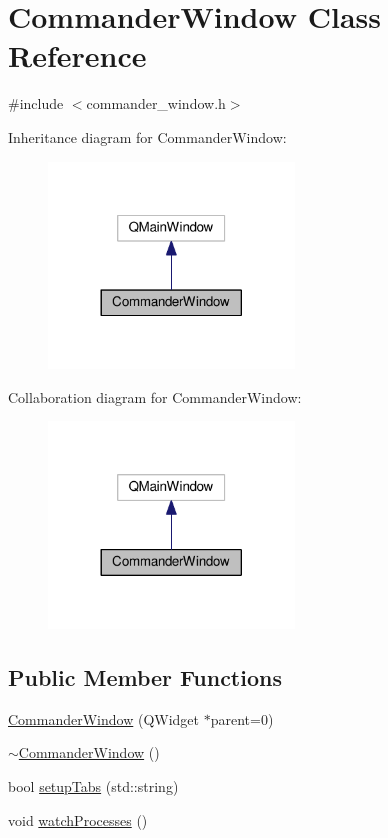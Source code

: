 \hypertarget{classCommanderWindow}{}\section{Commander\+Window Class Reference}
\label{classCommanderWindow}


{\ttfamily \#include $<$commander\+\_\+window.\+h$>$}



Inheritance diagram for Commander\+Window\+:\nopagebreak
\begin{figure}[H]
\begin{center}
\leavevmode
\includegraphics[width=185pt]{classCommanderWindow__inherit__graph}
\end{center}
\end{figure}


Collaboration diagram for Commander\+Window\+:\nopagebreak
\begin{figure}[H]
\begin{center}
\leavevmode
\includegraphics[width=185pt]{classCommanderWindow__coll__graph}
\end{center}
\end{figure}
\subsection*{Public Member Functions}
\begin{DoxyCompactItemize}
\item 
\hyperlink{classCommanderWindow_a722cab557ae14b97b23fb6366be5d21a}{Commander\+Window} (Q\+Widget $\ast$parent=0)
\item 
\hyperlink{classCommanderWindow_a4853aef2189ab44a52d6f07f09b2fa3b}{$\sim$\+Commander\+Window} ()
\item 
bool \hyperlink{classCommanderWindow_ac66b82e4768cd74a68c3e1cb0cf03dd9}{setup\+Tabs} (std\+::string)
\item 
void \hyperlink{classCommanderWindow_a0dccc9dc555a2f2f271ecda8634e4a60}{watch\+Processes} ()
\end{DoxyCompactItemize}
